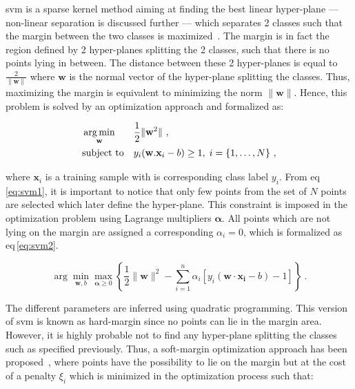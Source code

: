 \Acf{svm} is a sparse kernel method aiming at finding the best linear hyper-plane --- non-linear separation is discussed further --- which separates 2 classes such that the margin between the two classes is maximized~\cite{Vapnik1963}.
The margin is in fact the region defined by 2 hyper-planes splitting the 2 classes, such that there is no points lying in between.
The distance between these 2 hyper-planes is equal to $\frac{2}{\|\mathbf{w}\|}$ where $\mathbf{w}$ is the normal vector of the hyper-plane splitting the classes.
Thus, maximizing the margin is equivalent to minimizing the norm $\|\mathbf{w}\|$.
Hence, this problem is solved by an optimization approach and formalized as:

\begin{equation}
\begin{aligned}
& \operatorname*{arg\,min}_{\mathbf{w}}
& & \frac{1}{2} \| \mathbf{w}^2\| \ , \\
& \text{subject to}
& & y_i(\mathbf{w}.\mathbf{x}_i - b) \geq 1, \; i = \{ 1, \ldots, N \} \ ,
\end{aligned}
\label{eq:svm1}
\end{equation}

\noindent where $\mathbf{x}_i$ is a training sample with is corresponding class label $y_i$.
From \acs{eq}\,\eqref{eq:svm1}, it is important to notice that only few points from the set of $N$ points are selected which later define the hyper-plane.
This constraint is imposed in the optimization problem using Lagrange multipliers $\boldsymbol{\alpha}$.
All points which are not lying on the margin are assigned a corresponding $\alpha_i = 0$, which is formalized as \acs{eq}\,\eqref{eq:svm2}.

\begin{equation}
	\arg\min_{\mathbf{w},b } \max_{\boldsymbol{\alpha}\geq 0 } \left\{ \frac{1}{2}\|\mathbf{w}\|^2 - \sum_{i=1}^{n}{\alpha_i[y_i(\mathbf{w}\cdot \mathbf{x_i} - b)-1]} \right\} \ .
	\label{eq:svm2}
\end{equation}

The different parameters are inferred using quadratic programming.
This version of \ac{svm} is known as hard-margin since no points can lie in the margin area.
However, it is highly probable not to find any hyper-plane splitting the classes such as specified previously.
Thus, a soft-margin optimization approach has been proposed~\cite{Cortes1995}, where points have the possibility to lie on the margin but at the cost of a penalty $\xi_i$ which is minimized in the optimization process such that:

